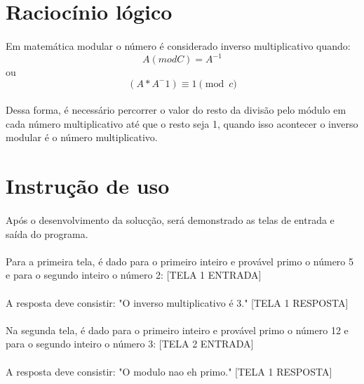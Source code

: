 \documentclass[11pt]{article}
\begin{document}
\section{Racioc\'inio l\'ogico} 
    \paragraph{}	Em matem\'atica modular o n\'umero \'e considerado inverso multiplicativo quando: \begin{equation} A(mod C) = A^{-1} \end{equation} ou  \begin{equation} (A * A^-1) \equiv 1 \pmod{c} \end{equation} 
    \paragraph{}	Dessa forma, \'e necess\'ario percorrer o valor do resto da divis\~ao pelo m\'odulo em cada n\'umero multiplicativo at\'e que o resto seja 1, quando isso acontecer o inverso modular \'e o n\'umero multiplicativo.
        
\section{Instru\c{c}\~ao de uso}
        \paragraph{}    Ap\'os o desenvolvimento da soluc\c{c}\~ao, ser\'a demonstrado as telas de entrada e sa\'ida do programa.
        \paragraph{}    Para a primeira tela, \'e dado para o primeiro inteiro e prov\'avel primo o n\'umero 5 e para o segundo inteiro o n\'umero 2:
        [TELA 1 ENTRADA]
        \paragraph{}    A resposta deve consistir: "O inverso multiplicativo \'e 3."
        [TELA 1 RESPOSTA]
        \paragraph{}    Na segunda tela, \'e dado para o primeiro inteiro e prov\'avel primo o n\'umero 12 e para o segundo inteiro o n\'umero 3:
        [TELA 2 ENTRADA]
        \paragraph{}    A resposta deve consistir: "O modulo nao eh primo."
        [TELA 1 RESPOSTA]
\end{document}
